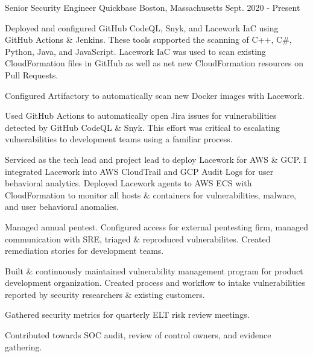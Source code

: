 

\begin{cventries}
\vspace{-3mm}
  \cventry
    {Senior Security Engineer} %
    {Quickbase} %
    {Boston, Massachusetts} %
    {Sept. 2020 - Present} %
    {
      \begin{cvitems} %
        \item {
            Deployed and configured GitHub CodeQL, Snyk, and Lacework IaC using GitHub Actions \& Jenkins. These tools supported the scanning of C++, C\#, Python, Java, and JavaScript. Lacework IaC was used to scan existing CloudFormation files in GitHub as well as net new CloudFormation resources on Pull Requests.
        }
        \item {
            Configured Artifactory to automatically scan new Docker images with Lacework.
        }
        \item {
            Used GitHub Actions to automatically open Jira issues for vulnerabilities detected by GitHub CodeQL \& Snyk. This effort was critical to escalating vulnerabilities to development teams using a familiar process.
        }
        \item {
            Serviced as the tech lead and project lead to deploy Lacework for AWS \& GCP. I integrated Lacework into AWS CloudTrail and GCP Audit Logs for user behavioral analytics. Deployed Lacework agents to AWS ECS with CloudFormation to monitor all hosts \& containers for vulnerabilities, malware, and user behavioral anomalies.
        }
        \item {
            Managed annual pentest. Configured access for external pentesting firm, managed communication with SRE, triaged \& reproduced vulnerabilites. Created remediation stories for development teams.
        }
        \item {
            Built \& continuously maintained vulnerability management program for product development organization. Created process and workflow to intake vulnerabilities reported by security researchers \& existing customers.
        }
        \item {
            Gathered security metrics for quarterly ELT risk review meetings.
        }
        \item {
            Contributed towards SOC audit, review of control owners, and evidence gathering.
        }
      \end{cvitems}
    }


\end{cventries}
